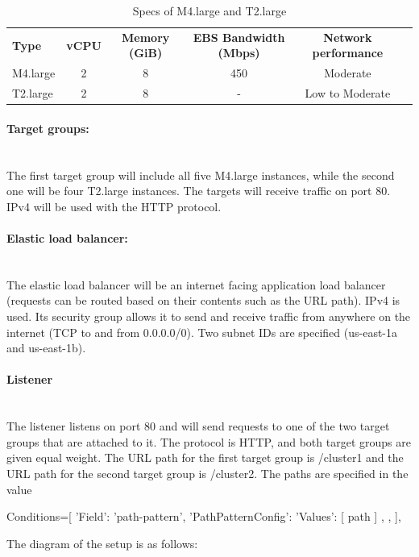 \documentclass[11pt]{article}
\begin{document}
\begin{table}[h!]
    \caption{Specs of M4.large and T2.large}
    \label{tab:table1}
    \begin{tabular}{|l|c|c|c|c|r|}
        \hline
        \textbf{Type} & \textbf{vCPU} & \textbf{Memory (GiB)} & \textbf{EBS Bandwidth (Mbps)} & \textbf{Network performance}\\
        M4.large & 2 & 8 &450 &Moderate\\
        T2.large & 2 & 8 &- &Low to Moderate\\
        \hline
    \end{tabular}
\end{table}

\paragraph{Target groups:}\mbox{}\\
The first target group will include all five M4.large instances, while the second one will be four T2.large instances. The targets will receive traffic on port 80. IPv4 will be used with the HTTP protocol.

\paragraph{Elastic load balancer:}\mbox{}\\
The elastic load balancer will be an internet facing application load balancer (requests can be routed based on their contents such as the URL path). IPv4 is used. Its security group allows it to send and receive traffic from anywhere on the internet (TCP to and from 0.0.0.0/0). Two subnet IDs are specified (us-east-1a and us-east-1b).

\paragraph{Listener}\mbox{}\\
The listener listens on port 80 and will send requests to one of the two target groups that are attached to it. The protocol is HTTP, and both target groups are given equal weight. The URL path for the first target group is /cluster1 and the URL path for the second target group is /cluster2. The paths are specified in the value

\begin{python}
    Conditions=[
        {
            'Field': 'path-pattern',
            'PathPatternConfig': {
                'Values': [
                    path
                ]
            },
        },
    ],
\end{python}
The diagram of the setup is as follows:\\
\end{document}
